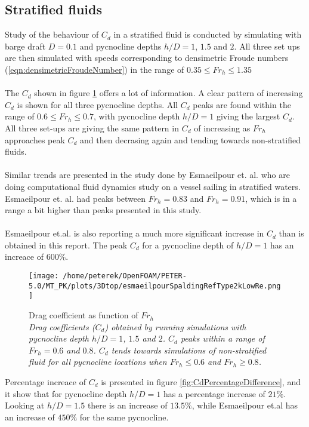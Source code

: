 \documentclass[a4paper, 12pt]{report}
\begin{document}
\subsection{Stratified fluids}
Study of the behaviour of $C_d$ in a stratified fluid is conducted by simulating with barge draft $D=0.1$ and pycnocline depths $h/D=1$, $1.5$ and $2$. All three set ups are then simulated with speeds corresponding to densimetric Froude numbers (\ref{eqn:densimetricFroudeNumber}) in the range of $0.35\leq Fr_h \leq 1.35$\\
\\
The $C_d$ shown in figure \ref{fig:Cd} offers a lot of information. A clear pattern of increasing $C_d$ is shown for all three pycnocline depths. All $C_d$ peaks are found within the range of $0.6 \leq Fr_h \leq 0.7$, with pycnocline depth $h/D=1$ giving the largest $C_d$. All three set-ups are giving the same pattern in $C_d$ of increasing as $Fr_h$ approaches peak $C_d$ and then decrasing again and tending towards non-stratified fluids.\\
\\
Similar trends are presented in the study done by Esmaeilpour et. al. \cite{Esmaeilpour} who are doing computational fluid dynamics study on a vessel sailing in stratified waters.  Esmaeilpour et. al. had peaks between $Fr_h=0.83$ and $Fr_h=0.91$, which is in a range a bit higher than peaks presented in this study.\\
\\
Esmaeilpour et.al. is also reporting a much more significant increase in $C_d$ than is obtained in this report. The peak $C_d$ for a pycnocline depth of $h/D=1$ has an increace of $600\%$.
\begin{figure}[H]
	\centering
	\texttt{[image: /home/peterek/OpenFOAM/PETER-5.0/MT\_PK/plots/3Dtop/esmaeilpourSpaldingRefType2kLowRe.png]}
	\caption{Drag coefficient as function of $Fr_h$  \\ \textit{Drag coefficients ($C_d$) obtained by running simulations with pycnocline depth $h/D=1$, $1.5$ and $2$. $C_d$ peaks within a range of $Fr_h = 0.6$ and $0.8$. $C_d$ tends towards simulations of non-stratified fluid for all pycnocline locations when $Fr_h \leq 0.6$ and $Fr_h \geq 0.8$.}}
	\label{fig:Cd}
\end{figure}
Percentage increace of $C_d$ is presented in figure \ref{fig:CdPercentageDifference}, and it show that for pycnocline depth $h/D=1$ has a percentage increase of $21\%$. Looking at $h/D=1.5$ there is an increase of $13.5\%$, while Esmaeilpour et.al has an increase of $450\%$ for the same pycnocline.\\
\end{document}
